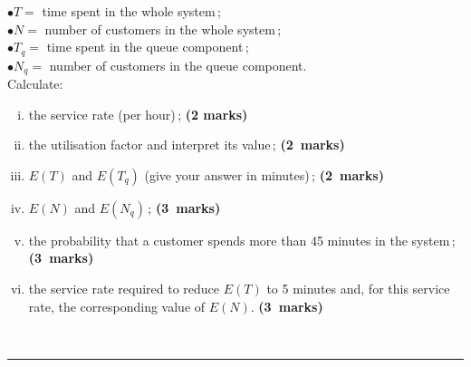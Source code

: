 \documentclass[12pt]{article}
\begin{document}
\begin{enumerate}[a)]
    \phantom{a}\qquad\qquad$\bullet$\quad $T=$ time spent in the whole system\,;\\[0.2cm]
    \phantom{a}\qquad\qquad$\bullet$\quad  $N=$ number of customers in the whole system\,;\\[0.2cm]
    \phantom{a}\qquad\qquad$\bullet$\quad  $T_q=$ time spent in the queue component\,;\\[0.2cm]
    \phantom{a}\qquad\qquad$\bullet$\quad  $N_q=$ number of customers in the queue component.\\[0.4cm]
    Calculate:
    \begin{enumerate}[i)]\itemsep0.2cm
    \item the service rate (per hour)\,; \hfill{\scriptsize \bf (2 marks)}
    \item the utilisation factor and interpret its value\,; \hfill{\mbox{\scriptsize \bf (2 marks)}}
    \item $E(T)$ and $E(T_q)$ (give your answer in minutes)\,; \hfill{\mbox{\scriptsize \bf (2 marks)}}
    \item $E(N)$ and $E(N_q)$\,; \hfill{\mbox{\scriptsize \bf (3 marks)}}
     \item the probability that a customer spends more than 45 minutes in the system\,; \hfill{\mbox{\scriptsize \bf (3 marks)}}
     \item the service rate required to reduce $E(T)$ to 5 minutes and, for this service rate, the corresponding value of $E(N)$. \hfill{\mbox{\scriptsize \bf (3 marks)}}
    \end{enumerate}
\end{enumerate}
\quad\\[-0.3cm]
\noindent\rule{\linewidth}{1pt}




\newpage
\end{document}
